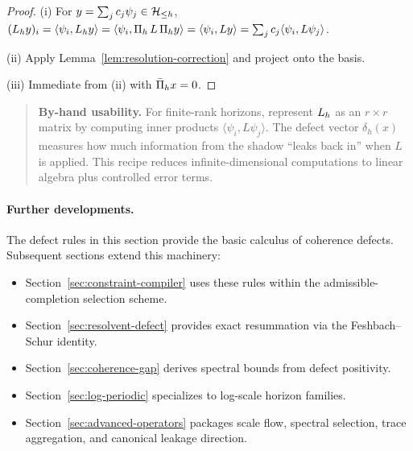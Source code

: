 \begin{proof}
(i) For $y = \sum_j c_j \psi_j \in \mathcal{H}_{\le h}$, $(L_{h} y)_i = \langle \psi_i, L_{h} y \rangle = \langle \psi_i, \Pi_{h}\, L \,\Pi_{h} y \rangle = \langle \psi_i, L y \rangle = \sum_j c_j \langle \psi_i, L \psi_j \rangle$.

(ii) Apply Lemma~\ref{lem:resolution-correction} and project onto the basis.

(iii) Immediate from (ii) with $\bar{\Pi}_{h} x = 0$.
\end{proof}

\begin{quote}\small
\textbf{By-hand usability.} For finite-rank horizons, represent $L_{h}$ as an $r \times r$ matrix by computing inner products $\langle \psi_i, L \psi_j \rangle$. The defect vector $\delta_h(x)$ measures how much information from the shadow ``leaks back in'' when $L$ is applied. This recipe reduces infinite-dimensional computations to linear algebra plus controlled error terms.
\end{quote}

\paragraph{Further developments.}
The defect rules in this section provide the basic calculus of coherence defects.
Subsequent sections extend this machinery:
\begin{itemize}[itemsep=0.2em]
\item Section~\ref{sec:constraint-compiler} uses these rules within the admissible-completion selection scheme.
\item Section~\ref{sec:resolvent-defect} provides exact resummation via the Feshbach--Schur identity.
\item Section~\ref{sec:coherence-gap} derives spectral bounds from defect positivity.
\item Section~\ref{sec:log-periodic} specializes to log-scale horizon families.
\item Section~\ref{sec:advanced-operators} packages scale flow, spectral selection, trace aggregation, and canonical leakage direction.
\end{itemize}
